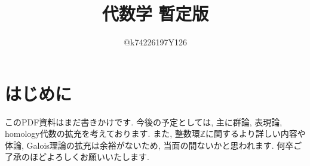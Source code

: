 \documentclass[10pt,a4paper,titlepage]{jsarticle}
\title{代数学 暫定版}
\author{@k74226197Y126}
\begin{document}
\maketitle
{}
\section*{はじめに}
\par
このPDF資料はまだ書きかけです. 今後の予定としては, 主に群論, 表現論, homology代数の拡充を考えております. また, 整数環$\mathbb{Z}$に関するより詳しい内容や体論, Galois理論の拡充は余裕がないため, 当面の間ないかと思われます. 何卒ご了承のほどよろしくお願いいたします. 
\tableofcontents
\clearpage
{}


\clearpage

\clearpage

\clearpage

\clearpage

\clearpage
\setcounter{section}{2}


\clearpage

\clearpage

\clearpage

\clearpage

\clearpage

\clearpage

\end{document}
